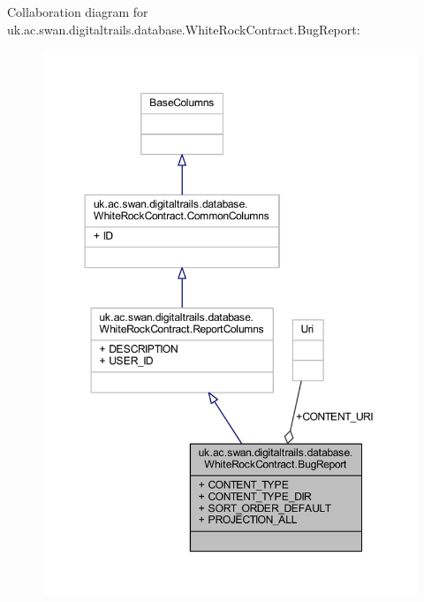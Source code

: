 Collaboration diagram for uk.\+ac.\+swan.\+digitaltrails.\+database.\+White\+Rock\+Contract.\+Bug\+Report\+:
\nopagebreak
\begin{figure}[H]
\begin{center}
\leavevmode
\includegraphics[width=350pt]{classuk_1_1ac_1_1swan_1_1digitaltrails_1_1database_1_1_white_rock_contract_1_1_bug_report__coll__graph}
\end{center}
\end{figure}
